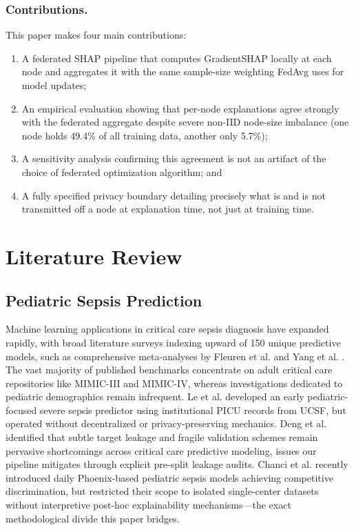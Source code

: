 \documentclass{svproc}
\begin{document}
\subsubsection{Contributions.} This paper makes four main contributions:
\begin{enumerate}
\item A federated SHAP pipeline that computes GradientSHAP locally at each node and aggregates it with the same sample-size weighting FedAvg uses for model updates;
\item An empirical evaluation showing that per-node explanations agree strongly with the federated aggregate despite severe non-IID node-size imbalance (one node holds 49.4\% of all training data, another only 5.7\%);
\item A sensitivity analysis confirming this agreement is not an artifact of the choice of federated optimization algorithm; and
\item A fully specified privacy boundary detailing precisely what is and is not transmitted off a node at explanation time, not just at training time.
\end{enumerate}

\section{Literature Review}\label{sec:litreview}

\subsection{Pediatric Sepsis Prediction}
Machine learning applications in critical care sepsis diagnosis have expanded rapidly, with broad literature surveys indexing upward of 150 unique predictive models, such as comprehensive meta-analyses by Fleuren et al. \cite{fleuren2020ml} and Yang et al. \cite{yang2023sepsis}. The vast majority of published benchmarks concentrate on adult critical care repositories like MIMIC-III and MIMIC-IV, whereas investigations dedicated to pediatric demographics remain infrequent. Le et al. \cite{le2019pediatric} developed an early pediatric-focused severe sepsis predictor using institutional PICU records from UCSF, but operated without decentralized or privacy-preserving mechanics. Deng et al. \cite{deng2022evaluating} identified that subtle target leakage and fragile validation schemes remain pervasive shortcomings across critical care predictive modeling, issues our pipeline mitigates through explicit pre-split leakage audits. Chanci et al. \cite{chanci2025machine} recently introduced daily Phoenix-based pediatric sepsis models achieving competitive discrimination, but restricted their scope to isolated single-center datasets without interpretive post-hoc explainability mechanisms---the exact methodological divide this paper bridges.
\end{document}
